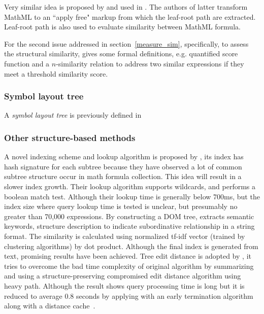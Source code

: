 Very similar idea is proposed by \cite{signifjap} and used in \cite{signfused}. The authors of latter transform MathML to an ``apply free" markup from which the leaf-root path are extracted. Leaf-root path is also used to evaluate similarity between MathML formula.

For the second issue addressed in section~\ref{measure_sim}, specifically, to assess the structural similarity, \cite{improving09} gives some formal definitions, e.g. quantified score function and a \mbox{$n$-similarity} relation to address two similar expressions if they meet a threshold similarity score.

\subsubsection*{Symbol layout tree}
A \textit{symbol layout tree} is previously defined in 

\cite{symbollayout12} 
\cite{symbollayout13:thesis} 
\cite{symbolpairs15} 
\cite{symbolpair15:2} 
\cite{WikiMirs13} 

\subsubsection*{Other structure-based methods}
A novel indexing scheme and lookup algorithm is proposed by \cite{newretrievalsystem}, its index has hash signature for each subtree because they have observed a lot of common subtree structure occur in math formula collection. This idea will result in a slower index growth. Their lookup algorithm supports wildcards, and performs a boolean match test. Although their lookup time is generally below 700ms, but the index size where query lookup time is tested is unclear, but presumably no greater than 70,000 expressions.
By constructing a DOM tree, \cite{DOMextraction} extracts semantic keywords, structure description to indicate subordinative relationship in a string format. The similarity is calculated using normalized tf-idf vector (trained by clustering algorithms) by dot product. Although the final index is generated from text, promising results have been achieved.  
Tree edit distance is adopted by \cite{editdisXML11}, it tries to overcome the bad time complexity of original algorithm by summarizing and using a structure-preserving compromised edit distance algorithm using heavy path. Although the result shows query processing time is long but it is reduced to average 0.8 seconds by applying with an early termination algorithm along with a distance cache~\cite{editdisXML13}.

